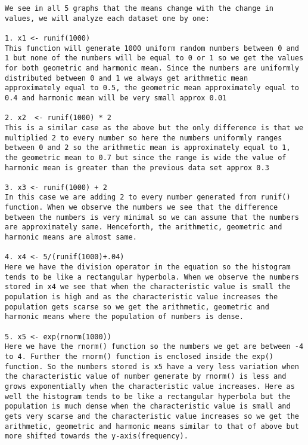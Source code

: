 \documentclass[]{article}
\begin{document}
\begin{verbatim}
We see in all 5 graphs that the means change with the change in values, we will analyze each dataset one by one:

1. x1 <- runif(1000)
This function will generate 1000 uniform random numbers between 0 and 1 but none of the numbers will be equal to 0 or 1 so we get the values for both geometric and harmonic mean. Since the numbers are uniformly distributed between 0 and 1 we always get arithmetic mean approximately equal to 0.5, the geometric mean approximately equal to 0.4 and harmonic mean will be very small approx 0.01

2. x2  <- runif(1000) * 2
This is a similar case as the above but the only difference is that we multiplied 2 to every number so here the numbers uniformly ranges between 0 and 2 so the arithmetic mean is approximately equal to 1, the geometric mean to 0.7 but since the range is wide the value of harmonic mean is greater than the previous data set approx 0.3

3. x3 <- runif(1000) + 2
In this case we are adding 2 to every number generated from runif() function. When we observe the numbers we see that the difference between the numbers is very minimal so we can assume that the numbers are approximately same. Henceforth, the arithmetic, geometric and harmonic means are almost same.

4. x4 <- 5/(runif(1000)+.04)
Here we have the division operator in the equation so the histogram tends to be like a rectangular hyperbola. When we observe the numbers stored in x4 we see that when the characteristic value is small the population is high and as the characteristic value increases the population gets scarse so we get the arithmetic, geometric and harmonic means where the population of numbers is dense.

5. x5 <- exp(rnorm(1000))
Here we have the rnorm() function so the numbers we get are between -4 to 4. Further the rnorm() function is enclosed inside the exp() function. So the numbers stored is x5 have a very less variation when the characteristic value of number generate by rnorm() is less and grows exponentially when the characteristic value increases. Here as well the histogram tends to be like a rectangular hyperbola but the population is much dense when the characteristic value is small and gets very scarse and the characteristic value increases so we get the arithmetic, geometric and harmonic means similar to that of above but more shifted towards the y-axis(frequency).


\end{verbatim}
\end{document}
